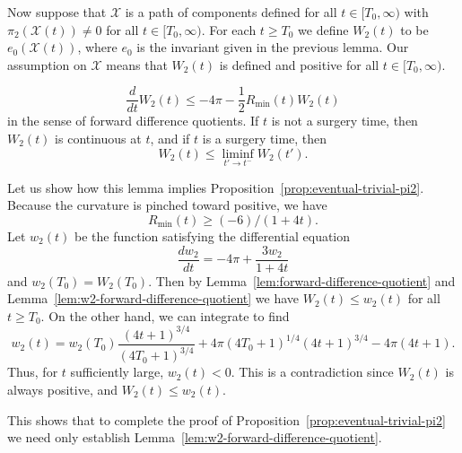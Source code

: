 Now suppose that ${\mathcal X}$ is a path of components defined for
all $t\in [T_0,\infty)$ with $\pi_2({\mathcal X}(t))\not= 0$ for all
$t\in [T_0,\infty)$.
 For
each $t\ge T_0$ we define $W_2(t)$ to be $e_0({\mathcal X}(t))$, where $e_0$ is
the invariant  given in the previous lemma. Our assumption on ${\mathcal X}$
means that $W_2(t)$ is defined and positive for all $t\in [T_0,\infty)$.

\begin{lemma}
\label{lem:w2-forward-difference-quotient}
\label{W_2}
$$\frac{d}{dt}W_2(t)\le -4\pi-\frac{1}{2}R_{\min}(t)W_2(t)$$
in the sense of forward difference quotients. If $t$ is not a
surgery time, then $W_2(t)$ is continuous at $t$, and if $t$ is a
surgery time, then $$W_2(t)\le \liminf_{t'\rightarrow
t^-}W_2(t').$$
\end{lemma}

Let us show how this lemma implies Proposition~\ref{prop:eventual-trivial-pi2}. Because
the curvature is pinched toward positive, we have
$$R_{\min}(t)\ge (-6)/(1+4t).$$
Let $w_2(t)$ be the function satisfying the differential equation
$$\frac{dw_2}{dt}=-4\pi+\frac{3w_2}{1+4t}$$
and $w_2(T_0)=W_2(T_0)$. Then by Lemma~\ref{lem:forward-difference-quotient} and
Lemma~\ref{lem:w2-forward-difference-quotient} we have $W_2(t)\le w_2(t)$ for all $t\ge T_0$. On
the other hand, we can integrate to find
$$w_2(t)=w_2(T_0)\frac{(4t+1)^{3/4}}{(4T_0+1)^{3/4}}+4\pi
(4T_0+1)^{1/4}(4t+1)^{3/4}-4\pi (4t+1).$$ Thus, for $t$ sufficiently
large, $w_2(t)<0$. This is a contradiction since $W_2(t)$ is always
positive, and $W_2(t)\le w_2(t)$.

This shows that to complete the proof of Proposition~\ref{prop:eventual-trivial-pi2} we
need only establish Lemma~\ref{lem:w2-forward-difference-quotient}.


